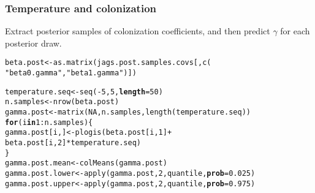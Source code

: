 \documentclass[color=usenames,dvipsnames]{beamer}\usepackage[]{graphicx}\usepackage[]{color}
\makeatletter
\newcommand{\hlnum}[1]{\textcolor[rgb]{0.69,0.494,0}{#1}}%
\newcommand{\hlstr}[1]{\textcolor[rgb]{0.749,0.012,0.012}{#1}}%
\newcommand{\hlopt}[1]{\textcolor[rgb]{0,0,0}{#1}}%
\newcommand{\hlstd}[1]{\textcolor[rgb]{0,0,0}{#1}}%
\newcommand{\hlkwa}[1]{\textcolor[rgb]{0,0,0}{\textbf{#1}}}%
\newcommand{\hlkwb}[1]{\textcolor[rgb]{0,0.341,0.682}{#1}}%
\newcommand{\hlkwc}[1]{\textcolor[rgb]{0,0,0}{\textbf{#1}}}%
\newcommand{\hlkwd}[1]{\textcolor[rgb]{0.004,0.004,0.506}{#1}}%
\newenvironment{kframe}{%
 \def\at@end@of@kframe{}%
 \ifinner\ifhmode%
  \def\at@end@of@kframe{\end{minipage}}%
  \begin{minipage}{\columnwidth}%
 \fi\fi%
 \def\FrameCommand##1{\hskip\@totalleftmargin \hskip-\fboxsep
 \colorbox{shadecolor}{##1}\hskip-\fboxsep
     \hskip-\linewidth \hskip-\@totalleftmargin \hskip\columnwidth}%
 \MakeFramed {\advance\hsize-\width
   \@totalleftmargin\z@ \linewidth\hsize
   \@setminipage}}%
 {\par\unskip\endMakeFramed%
 \at@end@of@kframe}
\newenvironment{knitrout}{}{} %
\makeatother
\begin{document}
\begin{frame}[fragile]
  \frametitle{Temperature and colonization}
  Extract posterior samples of colonization coefficients, and then
  predict $\gamma$ for each posterior draw.
\begin{knitrout}\footnotesize
{}\color{fgcolor}\begin{kframe}
\begin{alltt}
\hlstd{beta.post} \hlkwb{<-} \hlkwd{as.matrix}\hlstd{(jags.post.samples.covs[,}\hlkwd{c}\hlstd{(}
    \hlstr{"beta0.gamma"}\hlstd{,}\hlstr{"beta1.gamma"}\hlstd{)])}
\end{alltt}


{\ttfamily\noindent{}}

{\ttfamily\noindent{}}

{\ttfamily\noindent\bfseries{}}\begin{alltt}
\hlstd{temperature.seq} \hlkwb{<-} \hlkwd{seq}\hlstd{(}\hlopt{-}\hlnum{5}\hlstd{,} \hlnum{5}\hlstd{,} \hlkwc{length}\hlstd{=}\hlnum{50}\hlstd{)}
\hlstd{n.samples} \hlkwb{<-} \hlkwd{nrow}\hlstd{(beta.post)}
\hlstd{gamma.post} \hlkwb{<-} \hlkwd{matrix}\hlstd{(}\hlnum{NA}\hlstd{, n.samples,} \hlkwd{length}\hlstd{(temperature.seq))}
\hlkwa{for}\hlstd{(i} \hlkwa{in} \hlnum{1}\hlopt{:}\hlstd{n.samples) \{}
    \hlstd{gamma.post[i,]} \hlkwb{<-} \hlkwd{plogis}\hlstd{(beta.post[i,}\hlnum{1}\hlstd{]} \hlopt{+}
                             \hlstd{beta.post[i,}\hlnum{2}\hlstd{]}\hlopt{*}\hlstd{temperature.seq)}
\hlstd{\}}
\hlstd{gamma.post.mean} \hlkwb{<-} \hlkwd{colMeans}\hlstd{(gamma.post)}
\hlstd{gamma.post.lower} \hlkwb{<-} \hlkwd{apply}\hlstd{(gamma.post,} \hlnum{2}\hlstd{, quantile,} \hlkwc{prob}\hlstd{=}\hlnum{0.025}\hlstd{)}
\hlstd{gamma.post.upper} \hlkwb{<-} \hlkwd{apply}\hlstd{(gamma.post,} \hlnum{2}\hlstd{, quantile,} \hlkwc{prob}\hlstd{=}\hlnum{0.975}\hlstd{)}
\end{alltt}
\end{kframe}
\end{knitrout}
\end{frame}
\end{document}
